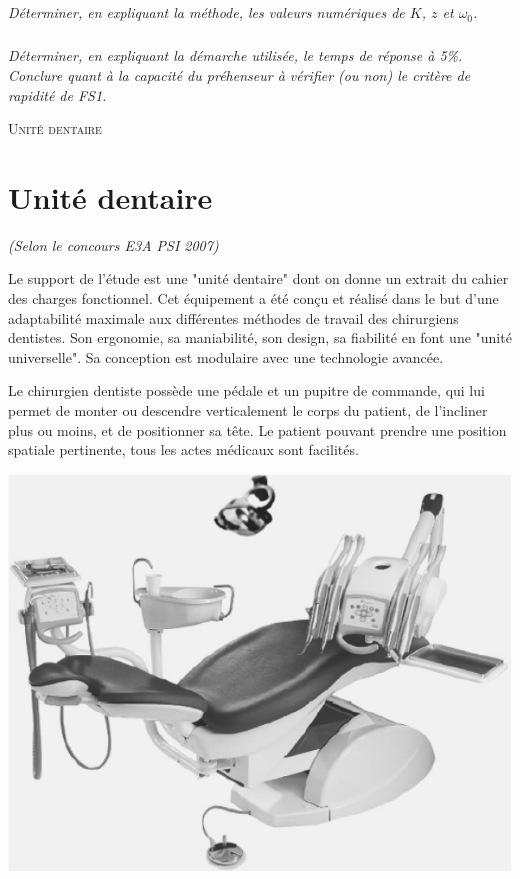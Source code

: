 \documentclass[10pt,fleqn]{article} %
\begin{document}
\begin{multicols}{2}
\subparagraph{}
\textit{Déterminer, en expliquant la méthode, les valeurs numériques de $K$, $z$ et $\omega_0$.}

\subparagraph{}
\textit{Déterminer, en expliquant la démarche utilisée, le temps de réponse à 5\%. Conclure quant à la capacité du préhenseur à vérifier (ou non) le critère de rapidité de FS1.}


\newpage
\setcounter{exo}{0}


\begin{center}
 \large\textsc{Unité dentaire}
\end{center}





\section*{Unité dentaire}
\textit{(Selon le concours E3A PSI 2007)}
\setcounter{exo}{0}


Le support de l'étude est une "unité dentaire" dont on donne un extrait du cahier des charges fonctionnel. Cet équipement a été conçu et réalisé dans le but d'une adaptabilité maximale aux différentes méthodes de travail des chirurgiens dentistes. Son ergonomie, sa maniabilité, son design, sa fiabilité en font une "unité universelle". Sa conception est modulaire avec une technologie avancée.

Le chirurgien dentiste possède une pédale et un pupitre de commande, qui lui permet de monter ou descendre verticalement le corps du patient, de l'incliner plus ou moins, et de positionner sa tête. Le patient pouvant prendre une position spatiale pertinente, tous les actes médicaux sont facilités.

\begin{center}
\includegraphics[width=\linewidth]{images/fig1}
\end{center}



\end{multicols}
\end{document}
